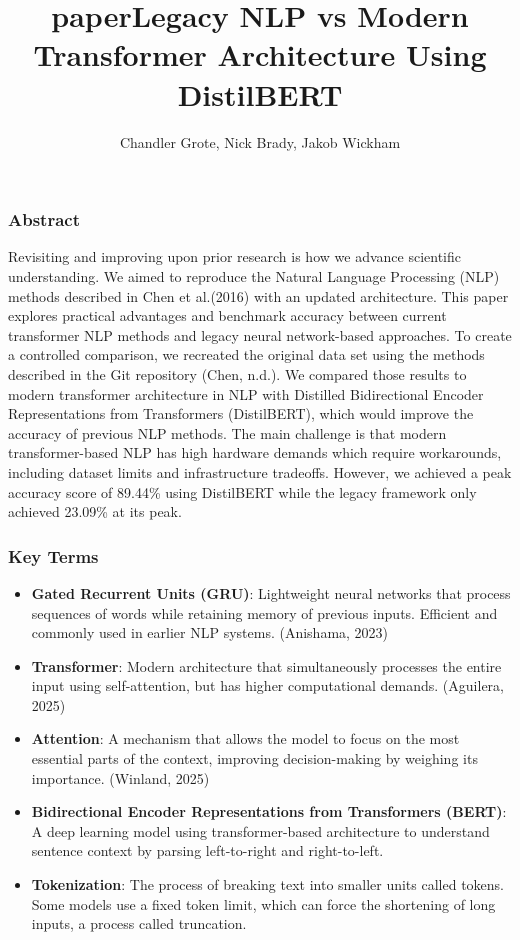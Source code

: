 \documentclass[11pt]{article}
\title{paper}
\providecommand{\tightlist}{%
      \setlength{\itemsep}{0pt}\setlength{\parskip}{0pt}}
\begin{document}
\title{Legacy NLP vs Modern Transformer Architecture Using DistilBERT}
\author{Chandler Grote, Nick Brady, Jakob Wickham}
\maketitle

    \subsubsection{Abstract}\label{abstract}

    Revisiting and improving upon prior research is how we advance
scientific understanding. We aimed to reproduce the Natural Language
Processing (NLP) methods described in Chen et al.(2016) with an updated
architecture. This paper explores practical advantages and benchmark
accuracy between current transformer NLP methods and legacy neural
network-based approaches. To create a controlled comparison, we
recreated the original data set using the methods described in the Git
repository (Chen, n.d.). We compared those results to modern transformer
architecture in NLP with Distilled Bidirectional Encoder Representations
from Transformers (DistilBERT), which would improve the accuracy of
previous NLP methods. The main challenge is that modern
transformer-based NLP has high hardware demands which require
workarounds, including dataset limits and infrastructure tradeoffs.
However, we achieved a peak accuracy score of 89.44\% using DistilBERT
while the legacy framework only achieved 23.09\% at its peak.

    \subsubsection{Key Terms}\label{key-terms}

\begin{samepage}
    \begin{itemize}
\tightlist
\item
  \textbf{Gated Recurrent Units (GRU)}: Lightweight neural networks that
  process sequences of words while retaining memory of previous inputs.
  Efficient and commonly used in earlier NLP systems. (Anishama, 2023)
\item
  \textbf{Transformer}: Modern architecture that simultaneously
  processes the entire input using self-attention, but has higher
  computational demands. (Aguilera, 2025)
\item
  \textbf{Attention}: A mechanism that allows the model to focus on the
  most essential parts of the context, improving decision-making by
  weighing its importance. (Winland, 2025)
\item
  \textbf{Bidirectional Encoder Representations from Transformers
  (BERT)}: A deep learning model using transformer-based architecture to
  understand sentence context by parsing left-to-right and
  right-to-left.
\item
  \textbf{Tokenization}: The process of breaking text into smaller units
  called tokens. Some models use a fixed token limit, which can force
  the shortening of long inputs, a process called truncation.
\end{itemize}
\end{samepage}
\end{document}
